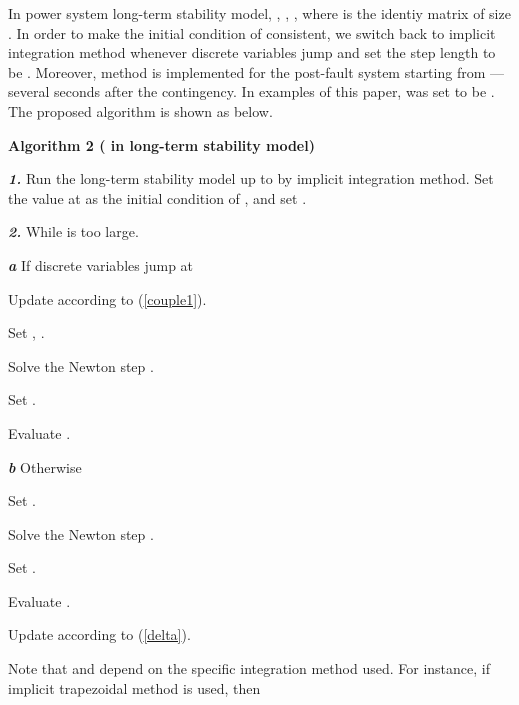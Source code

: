 \documentclass[journal]{IEEEtran}
\begin{document}
In power system long-term stability model, , , , where  is the identiy matrix of size . In order to make the initial condition of  consistent, we switch back to implicit integration method whenever discrete variables jump and set the step length to be . Moreover,  method is implemented for the post-fault system starting from ---several seconds after the contingency. In examples of this paper,  was set to be . The proposed algorithm is shown as below.
\begin{IEEEdescription}
\item[\textbf{Algorithm 2 ( in long-term stability model)}]
\item[\textbf{\textit{1.}}] Run the long-term stability model up to  by implicit integration method. Set the value  at  as the initial condition  of , and set .
\item[\textbf{\textit{2.}}] While  is too large.
\begin{LaTeXdescription}
\item[\textbf{\textit{a}}] If discrete variables jump at 
\begin{LaTeXdescription}
\item[\textbf{\textit{ }}]              Update  according to (\ref{couple1}).
\item[\textbf{\textit{ }}]              Set , .
\item[\textbf{\textit{ }}]              Solve the Newton step .
\item[\textbf{\textit{ }}]              Set .
\item[\textbf{\textit{ }}]              Evaluate .
\end{LaTeXdescription}
\item[\textbf{\textit{b}}] Otherwise
\begin{LaTeXdescription}
\item[\textbf{\textit{ }}] Set .
\item[\textbf{\textit{ }}] Solve the Newton step .
\item[\textbf{\textit{ }}] Set .
\item[\textbf{\textit{ }}] Evaluate .
\item[\textbf{\textit{ }}] Update  according to (\ref{delta}).
\end{LaTeXdescription}
\end{LaTeXdescription}
\end{IEEEdescription}

Note that  and  depend on the specific integration method used. For instance, if implicit trapezoidal method is used, then
\end{document}
